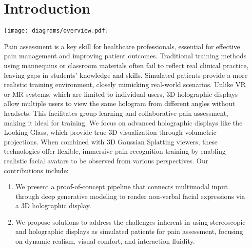 \documentclass[a4paper,twocolumn]{article}
\begin{document}
\section{Introduction}

\begin{figure*}[t!]
\texttt{[image: diagrams/overview.pdf]}
\end{figure*}


Pain assessment is a key skill for healthcare professionals, essential for effective pain management and improving patient outcomes. Traditional training methods using mannequins or classroom materials often fail to reflect real clinical practice, leaving gaps in students' knowledge and skills. Simulated patients provide a more realistic training environment, closely mimicking real-world scenarios. Unlike VR or MR systems, which are limited to individual users, 3D holographic displays allow multiple users to view the same hologram from different angles without headsets. This facilitates group learning and collaborative pain assessment, making it ideal for training. We focus on advanced holographic displays like the Looking Glass, which provide true 3D visualization through volumetric projections. When combined with 3D Gaussian Splatting viewers, these technologies offer flexible, immersive pain recognition training by enabling realistic facial avatars to be observed from various perspectives. Our contributions include:

\begin{enumerate}
    \item We present a proof-of-concept pipeline that connects multimodal input through deep generative modeling to render non-verbal facial expressions via a 3D holographic display. 
    \item We propose solutions to address the challenges inherent in using stereoscopic and holographic displays as simulated patients for pain assessment, focusing on dynamic realism, visual comfort, and interaction fluidity.
\end{enumerate}
\end{document}

